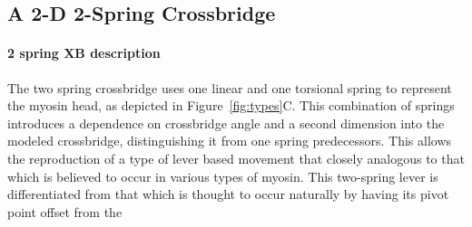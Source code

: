 \documentclass[]{article}
\begin{document}
% 
%  
% 
%  


\subsection*{A 2-D 2-Spring Crossbridge} %
\label{sub:a_2_d_2_spring_crossbridge}

\paragraph*{2 spring XB description} %
\label{par:2_spring_xb_description}
The two spring crossbridge uses one linear and one torsional spring to represent the myosin head, as depicted in Figure~\ref{fig:types}C.
This combination of springs introduces a dependence on crossbridge angle and a second dimension into the modeled crossbridge, distinguishing it from one spring predecessors.
This allows the reproduction of a type of lever based movement that closely analogous to that which is believed to occur in various types of myosin. \citet{Someone20xx, SomeoneElse19xx} 
This two-spring lever is differentiated from that which is thought to occur naturally by having its pivot point offset from the 
\end{document}
